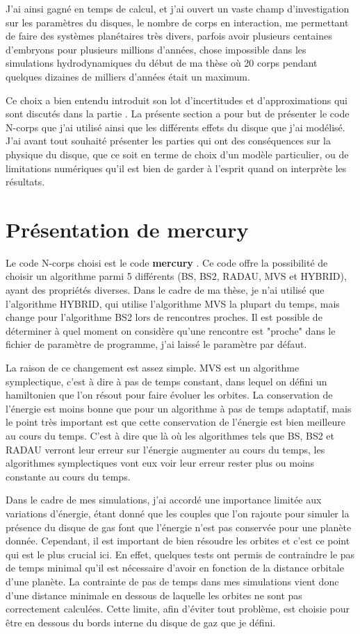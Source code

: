 \documentclass[a4paper,twoside]{report}
\begin{document}
J'ai ainsi gagné en temps de calcul, et j'ai ouvert un vaste champ d'investigation sur les paramètres du disques, le nombre de corps en interaction, me permettant de faire des systèmes planétaires très divers, parfois avoir plusieurs centaines d'embryons pour plusieurs millions d'années, chose impossible dans les simulations hydrodynamiques du début de ma thèse où 20 corps pendant quelques dizaines de milliers d'années était un maximum. 

Ce choix a bien entendu introduit son lot d'incertitudes et d'approximations qui sont discutés dans la partie . La présente section a pour but de présenter le code N-corps que j'ai utilisé ainsi que les différents effets du disque que j'ai modélisé. J'ai avant tout souhaité présenter les parties qui ont des conséquences sur la physique du disque, que ce soit en terme de choix d'un modèle particulier, ou de limitations numériques qu'il est bien de garder à l'esprit quand on interprète les résultats.

\section{Présentation de mercury}
Le code N-corps choisi est le code \textbf{mercury} \citep{chambers1999hybrid}. Ce code offre la possibilité de choisir un algorithme parmi 5 différents (BS, BS2, RADAU, MVS et HYBRID), ayant des propriétés diverses. Dans le cadre de ma thèse, je n'ai utilisé que l'algorithme HYBRID, qui utilise l'algorithme MVS la plupart du temps, mais change pour l'algorithme BS2 lors de rencontres proches. Il est possible de déterminer à quel moment on considère qu'une rencontre est "proche" dans le fichier de paramètre de programme, j'ai laissé le paramètre par défaut. 

La raison de ce changement est assez simple. MVS est un algorithme symplectique, c'est à dire à pas de temps constant, dans lequel on défini un hamiltonien que l'on résout pour faire évoluer les orbites. La conservation de l'énergie est moins bonne que pour un algorithme à pas de temps adaptatif, mais le point très important est que cette conservation de l'énergie est bien meilleure au cours du temps. C'est à dire que là où les algorithmes tels que BS, BS2 et RADAU verront leur erreur sur l'énergie augmenter au cours du temps, les algorithmes symplectiques vont eux voir leur erreur rester plus ou moins constante au cours du temps. 

Dans le cadre de mes simulations, j'ai accordé une importance limitée aux variations d'énergie, étant donné que les couples que l'on rajoute pour simuler la présence du disque de gas font que l'énergie n'est pas conservée pour une planète donnée. Cependant, il est important de bien résoudre les orbites et c'est ce point qui est le plus crucial ici. En effet, quelques tests ont permis de contraindre le pas de temps minimal qu'il est nécessaire d'avoir en fonction de la distance orbitale d'une planète. La contrainte de pas de temps dans mes simulations vient donc d'une distance minimale en dessous de laquelle les orbites ne sont pas correctement calculées. Cette limite, afin d'éviter tout problème, est choisie pour être en dessous du bords interne du disque de gaz que je défini.
\end{document}
